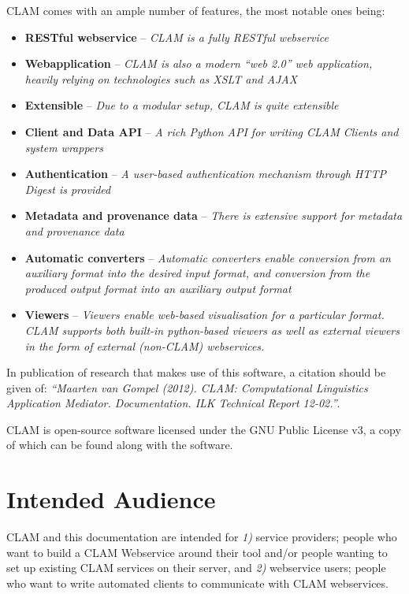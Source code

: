 \documentclass[a4paper,12pt]{report}
\begin{document}
CLAM comes with an ample number of features, the most notable ones being:

\begin{itemize}
\item \textbf{RESTful webservice} -- \emph{CLAM is a fully RESTful webservice}
\item \textbf{Webapplication} -- \emph{CLAM is also a modern ``web 2.0'' web application, heavily relying on technologies such as XSLT and AJAX}
\item \textbf{Extensible} -- \emph{Due to a modular setup, CLAM is quite extensible}
\item \textbf{Client and Data API} -- \emph{A rich Python API for writing CLAM Clients and system wrappers}
\item \textbf{Authentication} -- \emph{A user-based authentication mechanism through HTTP Digest is provided}
\item \textbf{Metadata and provenance data} -- \emph{There is extensive support for metadata and provenance data}
\item \textbf{Automatic converters} -- \emph{Automatic converters enable conversion from an auxiliary format into the desired input format, and conversion from the produced output format into an auxiliary output format}
\item \textbf{Viewers} -- \emph{Viewers enable web-based visualisation for a particular format. CLAM supports both built-in python-based viewers as well as external viewers in the form of external (non-CLAM) webservices.}
\end{itemize}

In publication of research that makes use of this software, a citation should
be given of: {\em ``Maarten van Gompel (2012). CLAM: Computational Linguistics
Application Mediator. Documentation. ILK Technical Report 12-02.''}.

CLAM is open-source software licensed under the GNU Public License v3, a copy
of which can be found along with the software.

\section{Intended Audience}

CLAM and this documentation are intended for \emph{1)} service providers;
people who want to build a CLAM Webservice around their tool and/or people
wanting to set up existing CLAM services on their server, and \emph{2)}
webservice users; people who want to write automated clients to communicate
with CLAM webservices.
\end{document}
